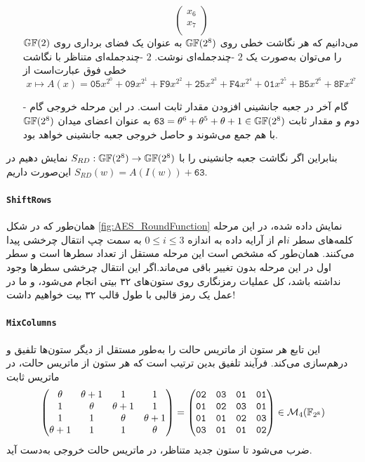 \begin{itemize}
$$\begin{pmatrix}
x_{6}\\
x_{7}\\
\end{pmatrix}
$$
می‌دانیم که هر نگاشت خطی روی 
$\mathbb{GF}(2^{8})$
به عنوان یک فضای برداری روی 
$\mathbb{GF}(2)$
را می‌توان به‌صورت یک 
$2$
-چندجمله‌ای نوشت. 
$2$
-چندجمله‌ای متناظر با نگاشت خطی فوق عبارت‌است از 
$$x \mapsto A(x) = \texttt{05}x^{2^{0}} + \texttt{09}x^{2^{1}} + \texttt{F9}x^{2^{2}} + \texttt{25}x^{2^{3}} + \texttt{F4}x^{2^{4}} + \texttt{01}x^{2^{5}} + \texttt{B5}x^{2^{6}} + \texttt{8F}x^{2^{7}}$$
\item[-]
گام آخر در جعبه جانشینی افزودن مقدار ثابت است. در این مرحله خروجی گام دوم و مقدار ثابت 
$\texttt{63} = \theta^{6} + \theta^{5} + \theta + 1\in \mathbb{GF}(2^{8})$
به عنوان اعضای میدان 
$\mathbb{GF}(2^{8})$
با هم جمع می‌شوند و حاصل خروجی جعبه جانشینی خواهد بود. 
\end{itemize}
بنابراین اگر نگاشت جعبه جانشینی را با 
$S_{RD}:\mathbb{GF}(2^{8})\rightarrow\mathbb{GF}(2^{8})$
نمایش دهیم در این‌صورت داریم 
$S_{RD}(w) = A(I(w)) + \texttt{63}$.
\paragraph*{\texttt{ShiftRows}}
همان‌طور که در شکل 
\ref{fig:AES_RoundFunction}
نمایش داده شده،  در این مرحله کلمه‌های  سطر 
$i$ام 
از آرایه داده به اندازه 
$0\leq i\leq 3$
به سمت چپ انتقال چرخشی پیدا می‌کنند. همان‌طور که مشخص است این مرحله مستقل از تعداد سطرها است و سطر اول در این مرحله بدون تغییر باقی می‌ماند.اگر این انتقال  چرخشی سطرها  وجود نداشته باشد، کل عملیات رمزنگاری روی ستون‌های ۳۲ بیتی انجام می‌شود، و ما در عمل یک رمز قالبی با طول قالب ۳۲ بیت خواهیم داشت!
\paragraph*{\texttt{MixColumns}}
این تابع هر ستون از ماتریس حالت را به‌طور مستقل از دیگر ستون‌ها تلفیق و درهم‌سازی می‌کند. فرآیند تلفیق بدین ترتیب است که هر ستون از ماتریس حالت، در  ماتریس ثابت 
\begin{equation*}
\begin{pmatrix}
\theta&\theta+1&1&1\\
1&\theta&\theta + 1&1\\
1&1&\theta&\theta + 1\\
\theta + 1&1&1&\theta
\end{pmatrix} = 
\begin{pmatrix}
	\texttt{02}&\texttt{03}&\texttt{01}&\texttt{01}\\
	\texttt{01}&\texttt{02}&\texttt{03}&\texttt{01}\\
	\texttt{01}&\texttt{01}&\texttt{02}&\texttt{03}\\
	\texttt{03}&\texttt{01}&\texttt{01}&\texttt{02}
\end{pmatrix}\in
{\mathcal M}_{4}(\mathbb{F}_{2^{8}})
\end{equation*}
ضرب می‌شود تا ستون جدید متناظر، در ماتریس حالت خروجی به‌دست آید.


